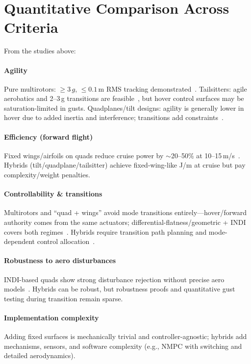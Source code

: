 \section{Quantitative Comparison Across Criteria}

From the studies above:

\paragraph{Agility}
Pure multirotors: $\geq 3\,g$, $\leq 0.1\,\mathrm{m}$ RMS tracking demonstrated~\cite{Tal2018,Foehn2022}.
Tailsitters: agile aerobatics and 2--3\,g transitions are feasible~\cite{Lu2022,Tal2022Global}, but hover control surfaces may be saturation-limited in gusts.
Quadplanes/tilt designs: agility is generally lower in hover due to added inertia and interference; transitions add constraints~\cite{Okulski2022,Misra2022}.

\paragraph{Efficiency (forward flight)}
Fixed wings/airfoils on quads reduce cruise power by $\sim$20--50\% at 10--15\,m/s~\cite{Dawkins2018,Xiao2020,Freitas2025}.
Hybrids (tilt/quadplane/tailsitter) achieve fixed-wing-like J/m at cruise but pay complexity/weight penalties.

\paragraph{Controllability \& transitions}
Multirotors and ``quad + wings'' avoid mode transitions entirely---hover/forward authority comes from the same actuators; differential-flatness/geometric + INDI covers both regimes~\cite{Lee2010,Tal2018}.
Hybrids require transition path planning and mode-dependent control allocation~\cite{DaudFilho2024,Misra2022}.

\paragraph{Robustness to aero disturbances}
INDI-based quads show strong disturbance rejection without precise aero models~\cite{Sieberling2010,Smeur2017,Sun2021}.
Hybrids can be robust, but robustness proofs and quantitative gust testing during transition remain sparse.

\paragraph{Implementation complexity}
Adding fixed surfaces is mechanically trivial and controller-agnostic; hybrids add mechanisms, sensors, and software complexity (e.g., NMPC with switching and detailed aerodynamics).


